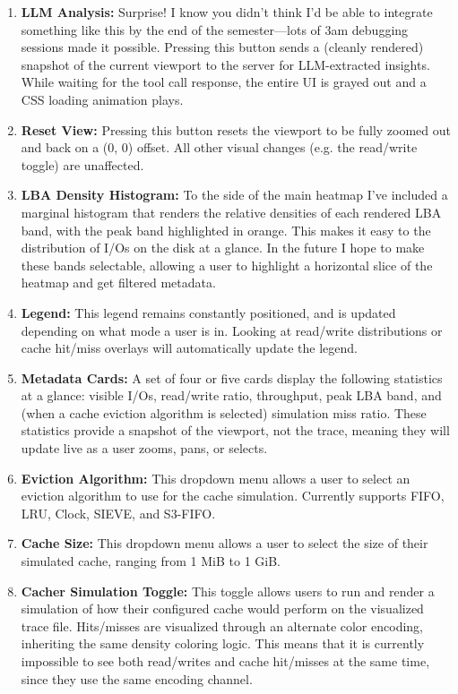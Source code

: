 \documentclass[11pt]{article}
\begin{document}
\begin{enumerate}
    \item \textbf{LLM Analysis:} Surprise!  I know you didn't think I'd be able to integrate something like this by the end of the semester---lots of 3am debugging sessions made it possible.  Pressing this button sends a (cleanly rendered) snapshot of the current viewport to the server for LLM-extracted insights.  While waiting for the tool call response, the entire UI is grayed out and a CSS loading animation plays.
    \item \textbf{Reset View:} Pressing this button resets the viewport to be fully zoomed out and back on a (0, 0) offset.  All other visual changes (e.g. the read/write toggle) are unaffected.
    \item \textbf{LBA Density Histogram:} To the side of the main heatmap I've included a marginal histogram that renders the relative densities of each rendered LBA band, with the peak band highlighted in orange.  This makes it easy to the distribution of I/Os on the disk at a glance.  In the future I hope to make these bands selectable, allowing a user to highlight a horizontal slice of the heatmap and get filtered metadata.
    \item \textbf{Legend:} This legend remains constantly positioned, and is updated depending on what mode a user is in.  Looking at read/write distributions or cache hit/miss overlays will automatically update the legend.
    \item \textbf{Metadata Cards:} A set of four or five cards display the following statistics at a glance: visible I/Os, read/write ratio, throughput, peak LBA band, and (when a cache eviction algorithm is selected) simulation miss ratio. These statistics provide a snapshot of the viewport, not the trace, meaning they will update live as a user zooms, pans, or selects.
    \item \textbf{Eviction Algorithm:} This dropdown menu allows a user to select an eviction algorithm to use for the cache simulation.  Currently supports FIFO, LRU, Clock, SIEVE, and S3-FIFO.
    \item \textbf{Cache Size:} This dropdown menu allows a user to select the size of their simulated cache, ranging from 1 MiB to 1 GiB.
    \item \textbf{Cacher Simulation Toggle:} This toggle allows users to run and render a simulation of how their configured cache would perform on the visualized trace file.  Hits/misses are visualized through an alternate color encoding, inheriting the same density coloring logic.  This means that it is currently impossible to see both read/writes and cache hit/misses at the same time, since they use the same encoding channel.

\end{enumerate}
\end{document}
